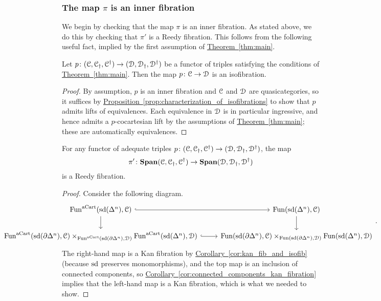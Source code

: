 \documentclass[main.tex]{subfiles}
\begin{document}
\subsubsection{The map \texorpdfstring{$\pi$}{pi} is an inner fibration}

We begin by checking that the map $\pi$ is an inner fibration. As stated above, we do this by checking that $\pi'$ is a Reedy fibration. This follows from the following useful fact, implied by the first assumption of \hyperref[thm:main]{Theorem~\ref*{thm:main}}.
\begin{lemma}
  Let $p\colon (\mathcal{C}, \mathcal{C}_{\dagger}, \mathcal{C}^{\dagger}) \to (\mathcal{D}, \mathcal{D}_{\dagger}, \mathcal{D}^{\dagger})$ be a functor of triples satisfying the conditions of \hyperref[thm:main]{Theorem~\ref*{thm:main}}. Then the map $p\colon \mathcal{C} \to \mathcal{D}$ is an isofibration.
\end{lemma}
\begin{proof}
  By assumption, $p$ is an inner fibration and $\mathcal{C}$ and $\mathcal{D}$ are quasicategories, so it suffices by \hyperref[prop:characterization_of_isofibrations]{Proposition~\ref*{prop:characterization_of_isofibrations}} to show that $p$ admits lifts of equivalences. Each equivalence in $\mathcal{D}$ is in particular ingressive, and hence admits a $p$-cocartesian lift by the assumptions of \hyperref[thm:main]{Theorem~\ref*{thm:main}}; these are automatically equivalences.
\end{proof}

\begin{proposition}
  For any functor of adequate triples $p\colon (\mathcal{C}, \mathcal{C}_{\dagger}, \mathcal{C}^{\dagger}) \to (\mathcal{D}, \mathcal{D}_{\dagger}, \mathcal{D}^{\dagger})$, the map
  \begin{equation*}
    \pi'\colon \mathbf{Span}(\mathcal{C}, \mathcal{C}_{\dagger}, \mathcal{C}^{\dagger}) \to \mathbf{Span}(\mathcal{D}, \mathcal{D}_{\dagger}, \mathcal{D}^{\dagger})
  \end{equation*}
  is a Reedy fibration.
\end{proposition}
\begin{proof}
  Consider the following diagram.
  \begin{equation*}
    \noindent\makebox[\textwidth]{%
      \begin{tikzcd}[ampersand replacement=\&]
        \Fun^{\aCart}(\sd(\Delta^{n}), \category{C})
        \arrow[r, hook]
        \arrow[d]
        \& \Fun(\sd(\Delta^{n}), \category{C})
        \arrow[d]
        \\
        \Fun^{\aCart}(\sd(\partial\Delta^{n}), \category{C})
        \times_{\Fun^{\aCart}(\sd(\partial\Delta^{n}), \category{D})}
        \Fun^{\aCart}(\sd(\Delta^{n}), \category{D})
        \arrow[r, hook]
        \& \Fun(\sd(\partial\Delta^{n}), \category{C})
        \times_{\Fun(\sd(\partial\Delta^{n}), \category{D})}
        \Fun(\sd(\Delta^{n}), \category{D})
      \end{tikzcd}.
    }
  \end{equation*}
  The right-hand map is a Kan fibration by \hyperref[cor:kan_fib_and_isofib]{Corollary~\ref*{cor:kan_fib_and_isofib}} (because $\mathrm{sd}$ preserves monomorphisms), and the top map is an inclusion of connected components, so \hyperref[cor:connected_components_kan_fibration]{Corollary~\ref*{cor:connected_components_kan_fibration}} implies that the left-hand map is a Kan fibration, which is what we needed to show.
\end{proof}
\end{document}
